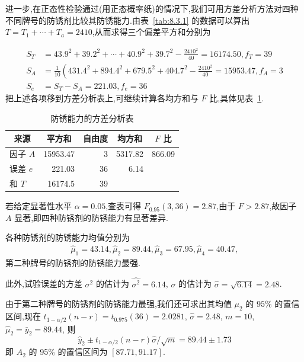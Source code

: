 \begin{example}
进一步,在正态性检验通过(用正态概率纸)的情况下,我们可用方差分析方法对四种不同牌号的防锈剂比较其防锈能力.由表~\ref{tab:8.3.1} 的数据可以算出 $T = T_1 + \cdots + T_a = 2410$,从而求得三个偏差平方和分别为

\begin{align*}
S_{T} & =43.9^{2}+39.2^{2}+\cdots+40.9^{2}+39.7^{2}-\frac{2410^{2}}{40}=16174.50, f_{T}=39 \\
S_{A} & =\frac{1}{10}\left(431.4^{2}+894.4^{2}+679.5^{2}+404.7^{2}-\frac{2410^{2}}{40}=15953.47, f_{A}=3\right. \\ 
S_{e} & =S_{T}-S_{A}=221.03, f_{e} = 36
\end{align*}
把上述各项移到方差分析表上,可继续计算各均方和与 $F$ 比,具体见表~\ref{tab:8.3.2}.

\begin{table}[htbp]
  \centering
  \caption{防锈能力的方差分析表}
    \begin{tabular}{lrrrr}
    \toprule
    \multicolumn{1}{c}{来源} & \multicolumn{1}{c}{平方和} & \multicolumn{1}{c}{自由度} & \multicolumn{1}{c}{均方和} & \multicolumn{1}{c}{$F$ 比} \\
    \midrule
    因子 $A$   & 15953.47 & 3     & 5317.82 & 866.09 \\
    误差 $e$   & 221.03 & 36    & 6.14  &  \\
    和 $T$    & 16174.5 & 39    &       &  \\
    \bottomrule
    \end{tabular}%
  \label{tab:8.3.2}%
\end{table}%


若给定显著性水平 $\alpha = 0.05$,查表可得 $F_{0.95}(3,36)=2.87$,由于 $F>2.87$,故因子 $A$ 显著,即四种防锈剂的防锈能力有显著差异.

各种防锈剂的防锈能力均值分别为
\begin{gather*}
\hat{\mu}_1=43.14, \hat{\mu}_2=89.44, \hat{\mu}_3=67.95, \hat{\mu}_4 = 40.47,
\end{gather*}
第二种牌号的防锈剂的防锈能力最强.
  
此外,试验误差的方差 $\sigma^2$ 的估计为 $\hat{\sigma^2}=6.14$, $\sigma$ 的估计为 $\hat{\sigma}=\sqrt{6.14}=
2.48$.

由于第二种牌号的防锈剂的防锈能力最强,我们还可求出其均值 $\mu_2$ 的 $95\%$ 的置信区间,现在 $t_{1-\alpha/2}(n-r)=t_{0.975}(36)=2.0281$, $\hat{\sigma}=2.48$, $m=10$, $\hat{\mu}_2=\bar{y}_2=89.44$, 则
\begin{equation*}
  \hat{y}_{2} \pm t_{1-\alpha / 2}(n-r) \hat{\sigma} / \sqrt{m}=89.44 \pm 1.73
\end{equation*}
即 $A_2$ 的 95\% 的置信区间为 $[87.71, 91.17]$.
\end{example}

